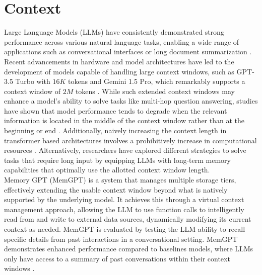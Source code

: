 \section{Context}
\label{sec:context}

Large Language Models (LLMs) have consistently demonstrated strong performance across various natural language tasks, enabling a wide range of applications such as conversational interfaces or long document summarization \cite{minaee2024largelanguagemodelssurvey}. Recent advancements in hardware and model architectures have led to the development of models capable of handling large context windows, such as GPT-3.5 Turbo with $16K$ tokens and Gemini 1.5 Pro, which remarkably supports a context window of $2M$ tokens 
\cite{liu2023lostmiddlelanguagemodels}\cite{geminiteam2024gemini15unlockingmultimodal}. While such extended context windows may enhance a model's ability to solve tasks like multi-hop question answering, studies have shown that model performance tends to degrade when the relevant information is located in the middle of the context window rather than at the beginning or end \cite{liu2023lostmiddlelanguagemodels}. Additionally, naively increasing the context length in transformer based architectures involves a prohibitively increase in computational resources \cite{kitaev2020reformerefficienttransformer}. Alternatively, researchers have explored different strategies to solve tasks that require long input by equipping LLMs with long-term memory capabilities that optimally use the allotted context window length.\\

\noindent Memory GPT (MemGPT) is a system that manages multiple storage tiers, effectively extending the usable context window beyond what is natively supported by the underlying model. It achieves this through a virtual context management approach, allowing the LLM to use function calls to intelligently read from and write to external data sources, dynamically modifying its current context as needed. MemGPT is evaluated by testing the LLM ability to recall specific details from past interactions in a conversational setting. MemGPT demonstrates enhanced performance compared to baselines models, where LLMs only have access to a summary of past conversations within their context windows \cite{packer2024memgptllmsoperatingsystems}.

